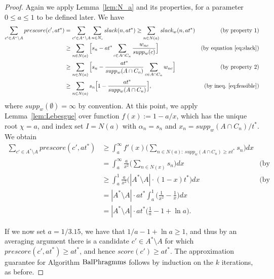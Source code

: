 \begin{proof}
Again we apply Lemma~\ref{lem:N_a} and its properties, for a parameter $0\leq a\leq 1$ to be defined later. We have
\begin{align*}
    \sum_{c'\in A^*\setminus A} prescore(c',at^*) &= \sum_{c'\in A^*\setminus A} \sum_{n\in N_c} slack(n, at^*) 
    \geq \sum_{n\in N(a)} slack_w(n, at^*) & \text{(by property 1)}\\
    &\geq \sum_{n\in N(a)} \Big[ s_n - at^* \sum_{c\in A\cap C_n} \frac{w_{nc}}{supp_w(c)} \Big] &\text{(by equation \ref{eq:slack})}\\
    &\geq \sum_{n\in N(a)} \Big[ s_n - \frac{at^*}{supp_w(A\cap C_n)} \sum_{c\in A\cap C_n} w_{nc} \Big] &\text{(by property 2)}\\
    &\geq \sum_{n\in N(a)} s_n\Big[ 1- \frac{at^*}{supp_w(A\cap C_n)} \Big], &\text{(by ineq.~\ref{eq:feasible})}
\end{align*}
%
where $supp_w(\emptyset)=\infty$ by convention. 
At this point, we apply Lemma~\ref{lem:Lebesgue} over function $f(x):=1-a/x$, which has the unique root $\chi=a$, and index set $I=N(a)$ with $\alpha_n=s_n$ and $x_n=supp_w(A\cap C_n)/t^*$. We obtain
\begin{align*}
    \sum_{c'\in A^*\setminus A} prescore(c',at^*) &\geq \int_{a}^{\infty} f'(x) \Big( \sum_{n\in N(a): \ supp_w(A\cap C_n)\geq xt^*} s_n \Big)dx\\
    &=\int_{a}^{\infty} \frac{a}{x^2}\Big( \sum_{n\in N(x)} s_n \Big)dx & \text{(by property 4)}\\
    &\geq \int_{a}^1 \frac{a}{x^2} \Big( |A^*\setminus A|\cdot (1-x)t^* \Big)dx & \text{(by property 3)}\\
    & = |A^*\setminus A|\cdot at^* \int_{a}^1 \Big( \frac{1}{x^2} - \frac{1}{x} \Big)dx \\
		&= |A^*\setminus A|\cdot at^*\Big(\frac{1}{a} - 1 + \ln  a\Big).
\end{align*}

If we now set $a=1/3.15$, we have that $1/a - 1 + \ln a\geq 1$, and thus by an averaging argument there is a candidate $c'\in A^*\setminus A$ for which $prescore(c',at^*)\geq at^*$, and hence $score(c')\geq at^*$. The approximation guarantee for Algorithm $\operatorname{BalPhragmms}$ follows by induction on the $k$ iterations, as before.
\end{proof}
